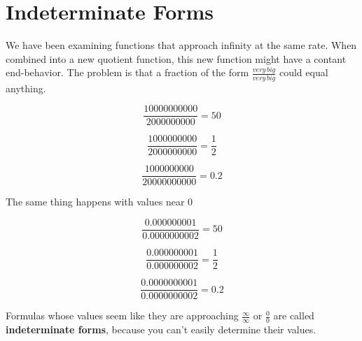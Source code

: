 \documentclass{ximera}
\begin{document}
\section{Indeterminate Forms}


We have been examining functions that approach infinity at the same rate. When combined into a new quotient function, this new function might have a contant end-behavior.  The problem is that a fraction of the form $\frac{very \, big}{very \, big}$ could equal anything.



\[  \frac{10000000000}{2000000000} = 50      \]

\[  \frac{1000000000}{2000000000} = \frac{1}{2}      \]

\[  \frac{1000000000}{20000000000} = 0.2      \]





The same thing happens with values near $0$


\[  \frac{0.000000001}{0.0000000002} = 50      \]

\[  \frac{0.000000001}{0.000000002} = \frac{1}{2}      \]

\[  \frac{0.0000000001}{0.0000000002} = 0.2      \]





Formulas whose values seem like they are approaching $\frac{\infty}{\infty}$ or $\frac{0}{0}$ are called \textbf{indeterminate forms}, because you can't easily determine their values.
\end{document}
